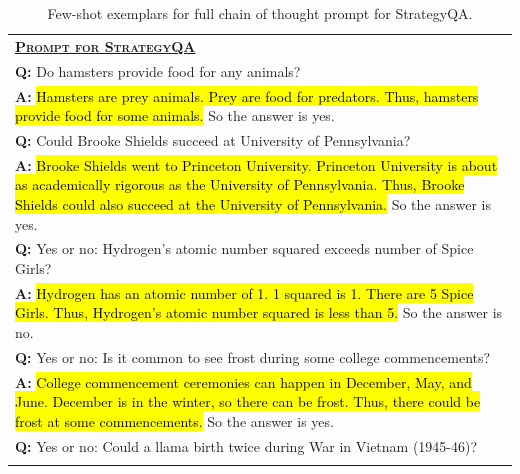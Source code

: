 \begingroup
\begin{table}[H]
    \centering
    \small
    \caption{    
    Few-shot exemplars for full chain of thought prompt for StrategyQA.
    }
    \begin{tabular}{p{\linewidth}}
        \toprule
        \underline{\textbf{\textsc{Prompt for StrategyQA}}} \\
        \vspace{-2mm}
        \textbf{Q:} Do hamsters provide food for any animals? \\
        \vspace{-1mm}
        \textbf{A:} \hl{Hamsters are prey animals. Prey are food for predators. Thus, hamsters provide food for some animals.} So the answer is yes. \\
        \vspace{0mm}
        \textbf{Q:} Could Brooke Shields succeed at University of Pennsylvania? \\
        \vspace{-1mm}
        \textbf{A:} \hl{Brooke Shields went to Princeton University. Princeton University is about as academically rigorous as the University of Pennsylvania. Thus, Brooke Shields could also succeed at the University of Pennsylvania.}  So the answer is yes. \\
        \vspace{0mm}
        \textbf{Q:} Yes or no: Hydrogen's atomic number squared exceeds number of Spice Girls? \\
        \vspace{-1mm}
        \textbf{A:} \hl{Hydrogen has an atomic number of 1. 1 squared is 1. There are 5 Spice Girls. Thus, Hydrogen's atomic number squared is less than 5.} So the answer is no. \\
        \vspace{0mm}
        \textbf{Q:} Yes or no: Is it common to see frost during some college commencements? \\
        \vspace{-1mm}
        \textbf{A:} \hl{College commencement ceremonies can happen in December, May, and June. December is in the winter, so there can be frost. Thus, there could be frost at some commencements.} So the answer is yes. \\
        \vspace{0mm}
        \textbf{Q:} Yes or no: Could a llama birth twice during War in Vietnam (1945-46)? \\
        \vspace{-1mm}

\end{tabular}
\end{table}
